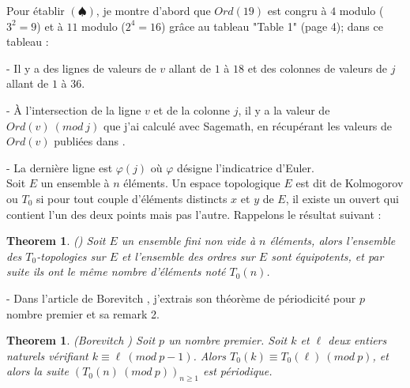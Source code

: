 \documentclass[12pt]{article}
\newtheorem{theorem}[definition]{{\bf Theorem}}
\begin{document}
 
\noindent Pour \'etablir $(\spadesuit)$, je montre d'abord que $Ord(19)$ est congru \`a $4$ modulo ($3^2 = 9$)    et  \`a $11$ modulo ($2^4 = 16$) gr\^ace au tableau "Table 1" (page 4); 
dans ce tableau :

 

%
%
%




 - Il y a des lignes de valeurs de $v$ allant de $1$ \`a $18$ et des colonnes de
 valeurs de $j$ allant de $1$ \`a $36$.

 

- \`A l'intersection de la ligne $v$ et de la colonne $j$, il y a la valeur de
$Ord(v) \ (mod \ j)$ que  j'ai calcul\'e avec Sagemath, en r\'ecup\'erant les valeurs de
$Ord(v)$ publi\'ees dans \cite{sloane}.

 

- La derni\`ere ligne est $\varphi(j)$ o\`u $\varphi$ d\'esigne  l'indicatrice d'Euler.\\
   

Soit $E$ un ensemble \`a $n$ \'el\'ements. 
Un espace topologique $E$ est dit de Kolmogorov ou $T_0$ si pour tout couple d'\'eléments distincts $x$ et $y$ de $E$, il existe un ouvert qui contient l'un des deux points mais pas l'autre. 
 Rappelons le r\'esultat suivant :
 \begin{theorem} \label{meme nombre} (\cite{Alexandrov, Birkhoff, Sharp})
 Soit $E$ un ensemble fini non vide \`a $n$ \'el\'ements, alors l'ensemble des $T_0$-topologies sur $E$ et l'ensemble des ordres sur $E$ sont \'equipotents, et par suite ils ont le m\^eme nombre d'\'el\'ements not\'e $T_0(n)$. 
\end{theorem}


- Dans l'article de Borevitch \cite{Bor80}, 
j'extrais son th\'eor\`eme de p\'eriodicit\'e pour $p$ nombre premier et sa remark 2. 

\begin{theorem} (Borevitch \cite{Bor80})
Soit $p$ un nombre premier. Soit $k$ et $\ell$ deux entiers naturels v\'erifiant $k\equiv \ell \ (mod \ p-1)$. Alors $T_0(k)\equiv T_0(\ell) \ (mod \ p)$, et alors la suite 
$(T_0(n)\ (mod \ p))_{n\geq 1}$ est p\'eriodique.
\end{theorem}
\end{document}
